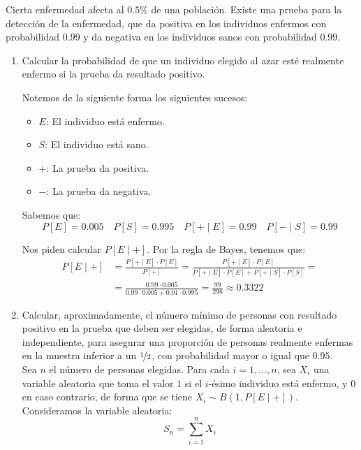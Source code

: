 \begin{ejercicio}
    Cierta enfermedad afecta al $0.5\%$ de una población. Existe una prueba para la detección de la enfermedad, que da positiva en los individuos enfermos con probabilidad $0.99$ y da negativa en los individuos sanos con probabilidad $0.99$.
    \begin{enumerate}
        \item Calcular la probabilidad de que un individuo elegido al azar esté realmente enfermo si la prueba da resultado positivo.
        
        Notemos de la siguiente forma los siguientes sucesos:
        \begin{itemize}
            \item $E$: El individuo está enfermo.
            \item $S$: El individuo está sano.
            \item $+$: La prueba da positiva.
            \item $-$: La prueba da negativa.
        \end{itemize}

        Sabemos que:
        \begin{equation*}
            P[E] = 0.005\quad
            P[S] = 0.995\quad
            P[+\mid E] = 0.99\quad
            P[-\mid S] = 0.99
        \end{equation*}

        Nos piden calcular $P[E\mid +]$. Por la regla de Bayes, tenemos que:
        \begin{align*}
            P[E\mid +] &= \frac{P[+\mid E] \cdot P[E]}{P[+]}
            = \frac{P[+\mid E] \cdot P[E]}{P[+\mid E] \cdot P[E] + P[+\mid S] \cdot P[S]}
            =\\&= \frac{0.99 \cdot 0.005}{0.99 \cdot 0.005 + 0.01 \cdot 0.995}
            = \frac{99}{298}
            \approx 0.3322
        \end{align*}
        \item Calcular, aproximadamente, el número mínimo de personas con resultado positivo en la prueba que deben ser elegidas, de forma aleatoria e independiente, para asegurar una proporción de personas realmente enfermas en la muestra inferior a un $\nicefrac{1}{2}$, con probabilidad mayor o igual que $0.95$.\\
        
        Sea $n$ el número de personas elegidas. Para cada $i=1, \ldots, n$, sea $X_i$ una variable aleatoria que toma el valor $1$ si el $i$-ésimo individuo está enfermo, y $0$ en caso contrario, de forma que se tiene $X_i \sim B(1, P[E\mid +])$. Consideramos la variable aleatoria:
        \[
            S_{n} = \sum_{i=1}^{n} X_i
        \]


\end{enumerate}
\end{ejercicio}

